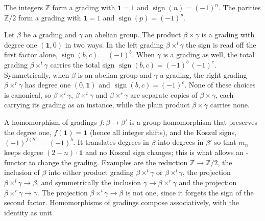\begin{definition}
\label{AInfinityTheory.Grading.standard}
\leanok
{}
The integers $\mathbb{Z}$ form a grading with $\mathbf{1} = 1$ and
$\operatorname{sign}(n) = (-1)^n$. The parities $\mathbb{Z}/2$ form a grading
with $\mathbf{1} = 1$ and $\operatorname{sign}(p) = (-1)^p$.
\end{definition}

\begin{definition}
\label{AInfinityTheory.Grading.prod}
\leanok
{}
Let $\beta$ be a grading and $\gamma$ an abelian group. The product
$\beta \times \gamma$ is a grading with
degree one $(\mathbf{1}, 0)$ in two ways. In the
left grading $\beta \times^l \gamma$ the sign is read off the first
factor alone, $\operatorname{sign}(b,c) = (-1)^b$. When $\gamma$ is a grading
as well, the total grading $\beta \times^t \gamma$ carries the total sign
$\operatorname{sign}(b,c) = (-1)^b\,(-1)^c$. Symmetrically, when $\beta$ is an
abelian group and $\gamma$ a grading, the right grading
$\beta \times^r \gamma$ has degree one $(0, \mathbf{1})$
and $\operatorname{sign}(b,c) = (-1)^c$. None of these choices is canonical, so
$\beta \times^l \gamma$, $\beta \times^t \gamma$ and $\beta \times^r \gamma$ are
separate copies of $\beta \times \gamma$, each carrying its grading as an instance,
while the plain product $\beta \times \gamma$ carries none.
\end{definition}

\begin{definition}
\label{AInfinityTheory.GradingHom}
\leanok
{}
A homomorphism of gradings $f : \beta \to \beta'$ is a group homomorphism that
preserves the degree one, $f(\mathbf{1}) = \mathbf{1}$ (hence all integer shifts),
and the Koszul signs, $(-1)^{f(b)} = (-1)^b$. It translates degrees in $\beta$ into
degrees in $\beta'$ so that $m_n$ keeps degree $(2-n) \cdot \mathbf{1}$ and no
Koszul sign changes; this is what allows an \Ainf{}-functor to change the grading.
Examples are the reduction $\mathbb{Z} \to \mathbb{Z}/2$, the inclusion of
$\beta$ into either product grading $\beta \times^t \gamma$ or
$\beta \times^l \gamma$, the projection $\beta \times^l \gamma \to \beta$, and
symmetrically the inclusion $\gamma \to \beta \times^r \gamma$ and the projection
$\beta \times^r \gamma \to \gamma$. The projection $\beta \times^t \gamma \to \beta$
is not one, since it forgets the sign of the second factor. Homomorphisms of
gradings compose associatively, with the identity as unit.
\end{definition}

